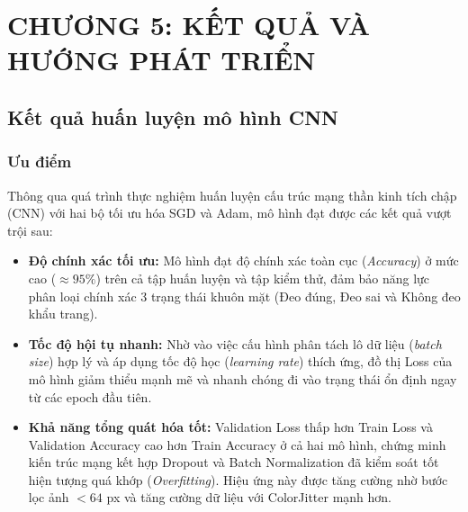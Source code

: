 \documentclass[a4paper,12pt]{article}
\begin{document}
\newpage
\section{CHƯƠNG 5: KẾT QUẢ VÀ HƯỚNG PHÁT TRIỂN}

\subsection{Kết quả huấn luyện mô hình CNN}

\subsubsection{Ưu điểm}
Thông qua quá trình thực nghiệm huấn luyện cấu trúc mạng thần kinh tích chập (CNN) với hai bộ tối ưu hóa SGD và Adam, mô hình đạt được các kết quả vượt trội sau:
\begin{itemize}
    \item \textbf{Độ chính xác tối ưu:} Mô hình đạt độ chính xác toàn cục (\textit{Accuracy}) ở mức cao ($\approx 95\%$) trên cả tập huấn luyện và tập kiểm thử, đảm bảo năng lực phân loại chính xác 3 trạng thái khuôn mặt (Đeo đúng, Đeo sai và Không đeo khẩu trang).
    \item \textbf{Tốc độ hội tụ nhanh:} Nhờ vào việc cấu hình phân tách lô dữ liệu (\textit{batch size}) hợp lý và áp dụng tốc độ học (\textit{learning rate}) thích ứng, đồ thị Loss của mô hình giảm thiểu mạnh mẽ và nhanh chóng đi vào trạng thái ổn định ngay từ các epoch đầu tiên.
    \item \textbf{Khả năng tổng quát hóa tốt:} Validation Loss thấp hơn Train Loss và Validation Accuracy cao hơn Train Accuracy ở cả hai mô hình, chứng minh kiến trúc mạng kết hợp Dropout và Batch Normalization đã kiểm soát tốt hiện tượng quá khớp (\textit{Overfitting}). Hiệu ứng này được tăng cường nhờ bước lọc ảnh $< 64$ px và tăng cường dữ liệu với ColorJitter mạnh hơn.
\end{itemize}
\end{document}
